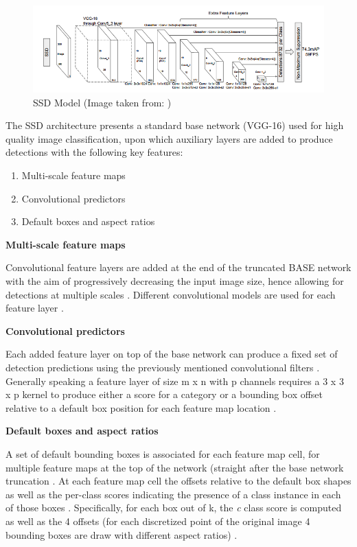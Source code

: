 \begin{figure}[!htbp]
\begin{center}
\includegraphics[width=\linewidth]{images/ssd_architecture.png}
\end{center}
\caption{SSD Model (Image taken from: \cite{paper:SSD})}
\label{fig:sshModel}
\end{figure}

The SSD architecture presents a standard base network (VGG-16) used for high quality image classification, upon which auxiliary layers are added to produce detections with the following key features:

\begin{enumerate}
  \item Multi-scale feature maps
  \item Convolutional predictors
  \item Default boxes and aspect ratios
\end{enumerate}

\textbf{Multi-scale feature maps}

Convolutional feature layers are added at the end of the truncated BASE network with the aim of progressively decreasing the input image size, hence allowing for detections at multiple scales \cite{paper:SSD}. Different convolutional models are used for each feature layer \cite{paper:SSD}.

\textbf{Convolutional predictors}

Each added feature layer on top of the base network can produce a fixed set of detection predictions using the previously mentioned convolutional filters \cite{paper:SSD}. Generally speaking a feature layer of size m x n with p channels requires a 3 x 3 x p kernel to produce either a score for a category or a bounding box offset relative to a default box position for each feature map location \cite{paper:SSD}.

\textbf{Default boxes and aspect ratios}

A set of default bounding boxes is associated for each feature map cell, for multiple feature maps at the top of the network (straight after the base network truncation \cite{paper:SSD}. At each feature map cell the offsets relative to the default box shapes as well as the per-class scores indicating the presence of a class instance in each of those boxes \cite{paper:SSD}. Specifically, for each box out of k, the \textit{c} class score is computed as well as the 4 offsets (for each discretized point of the original image 4 bounding boxes are draw with different aspect ratios) \cite{paper:SSD}.

